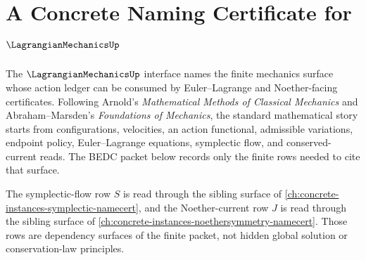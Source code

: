 \chapter{A Concrete Naming Certificate for $\LagrangianMechanicsUp$}
\label{ch:concrete-instances-lagrangianmechanics-namecert}

The $\LagrangianMechanicsUp$ interface names the finite mechanics surface
whose action ledger can be consumed by Euler--Lagrange and Noether-facing
certificates. Following Arnold's \emph{Mathematical Methods of Classical
Mechanics} and Abraham--Marsden's \emph{Foundations of Mechanics}, the
standard mathematical story starts from configurations, velocities, an action
functional, admissible variations, endpoint policy, Euler--Lagrange equations,
symplectic flow, and conserved-current reads. The BEDC packet below records
only the finite rows needed to cite that surface.

The symplectic-flow row $S$ is read through the sibling surface of
\autoref{ch:concrete-instances-symplectic-namecert}, and the Noether-current
row $J$ is read through the sibling surface of
\autoref{ch:concrete-instances-noethersymmetry-namecert}. Those rows are
dependency surfaces of the finite packet, not hidden global solution or
conservation-law principles.

